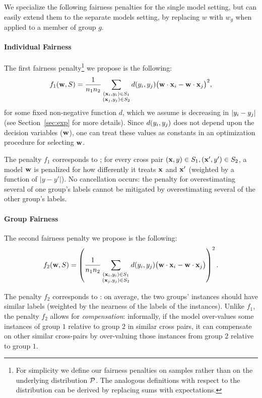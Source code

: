 We specialize the following fairness penalties for the single model
setting, but can easily extend them to the separate models setting, by
replacing $w$ with $w_g$ when applied to a member of group $g$.



\paragraph{Individual Fairness} The first fairness
penalty\footnote{For simplicity we define our fairness penalties on
  samples rather than on the underlying distribution $\mathcal{P}$.  The
  analogous definitions with respect to the distribution can be
  derived by replacing sums with expectations.}  we propose is the
following:
\begin{align}
f_1(\mathbf{w}, S) =\frac{1}{n_{1}n_{2}} \sum_{\substack{({\bf x}_{i}, y_{i})\in S_1\\ ({\bf x}_{j},y_{j})\in S_2}}
 d(y_{i},y_{j})\big(\mathbf{w}\cdot {\bf x}_{i}-\mathbf{w}\cdot {\bf x}_{j}\big)^2,\label{eqn:innersq}
\end{align}
for some fixed non-negative function $d$, which we assume is
decreasing in $|y_{i} - y_{j}|$ (see Section~\ref{sec:exp} for more
details).  Since $d(y_{i}, y_{j})$ does not depend upon the decision
variables ($\mathbf{w}$), one can treat these values as constants in an
optimization procedure for selecting $\mathbf{w}$.

The penalty $f_1$ corresponds to \emph{\ind}; for every cross pair
$(\mathbf{x},y)\in S_1, (\mathbf{x}', y')\in S_2$, a model $\mathbf{w}$ is penalized for
how differently it treats $\mathbf{x}$ and $\mathbf{x}'$ (weighted by a function of
$|y - y'|$). No cancellation occurs: the penalty for overestimating
several of one group's labels cannot be mitigated by overestimating
several of the other group's labels. 


\paragraph{Group Fairness}
The second fairness penalty we propose is the following:
%
\begin{align}
f_2(\mathbf{w},S) =
\left( \frac{1}{n_{1}n_{2}} \sum_{\substack{({\bf x}_{i},y_{i})\in S_1\\ ({\bf x}_{j},y_{j})\in S_2}} 
 d(y_{i},y_{j}) \big(\mathbf{w}\cdot {\bf x}_{i}-\mathbf{w}\cdot {\bf x}_{j}\big)\right)^2.\label{eqn:outersq}
\end{align}

The penalty $f_2$ corresponds to \emph{\grp}: on average, the two
groups' instances should have similar labels (weighted by the nearness
of the labels of the instances). Unlike $f_1$, the penalty $f_2$
allows for \emph{compensation}:
%
informally, if the model over-values some instances of group $1$
relative to group $2$ in similar cross pairs, it can compensate on
other similar cross-pairs by over-valuing those instances from group
$2$ relative to group $1$.

